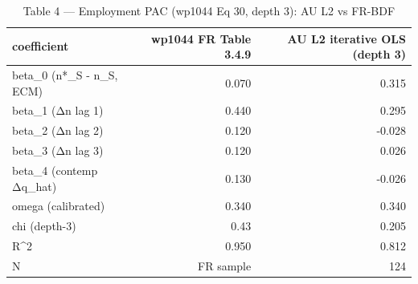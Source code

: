 \begin{table}[ht]
\centering
\caption{Table 4 — Employment PAC (wp1044 Eq 30, depth 3): AU L2 vs FR-BDF}
\begin{tabular}{lrr}
\toprule
coefficient & wp1044 FR Table 3.4.9 & AU L2 iterative OLS (depth 3) \\
\midrule
beta_0 (n*_S - n_S, ECM) & 0.070 & 0.315 \\
beta_1 (Δn lag 1) & 0.440 & 0.295 \\
beta_2 (Δn lag 2) & 0.120 & -0.028 \\
beta_3 (Δn lag 3) & 0.120 & 0.026 \\
beta_4 (contemp Δq_hat) & 0.130 & -0.026 \\
omega (calibrated) & 0.340 & 0.340 \\
chi (depth-3) & ~0.43 & 0.205 \\
R^2 & 0.950 & 0.812 \\
N & FR sample & 124 \\
\bottomrule
\end{tabular}
\end{table}
